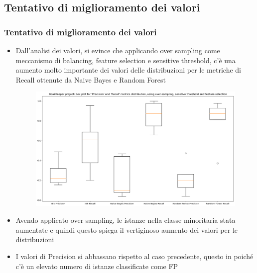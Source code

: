 \documentclass[10pt]{beamer}
\begin{document}
\begin{frame}
\subsection{Tentativo di miglioramento dei valori}
\frametitle{Tentativo di miglioramento dei valori}
\begin{itemize}
\item Dall'analisi dei valori, si evince che applicando over sampling come meccanismo di balancing, feature selection e sensitive threshold, c'è una aumento molto importante dei valori delle distribuzioni per le metriche di Recall ottenute da Naive Bayes e Random Forest
\begin{figure}
\includegraphics[scale=0.25]{images/pc_rc_2_bk}
\end{figure}
\item Avendo applicato over sampling, le istanze nella classe minoritaria stata aumentate e quindi questo spiega il vertiginoso aumento dei valori per le distribuzioni
\item I valori di Precision si abbassano rispetto al caso precedente, questo in poiché c'è un elevato numero di istanze classificate come FP
\end{itemize}
\end{frame}
\end{document}
